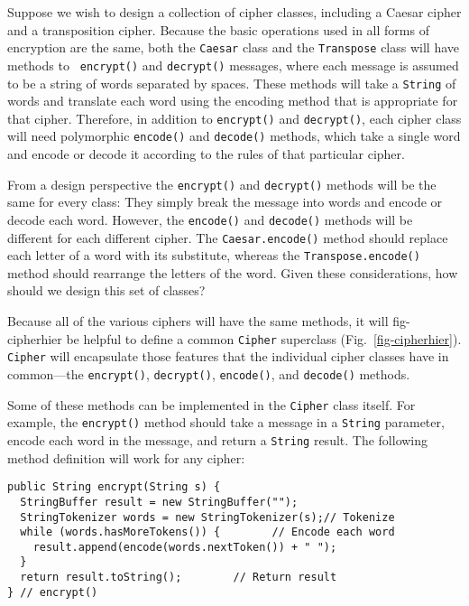 Suppose we wish to design a collection of cipher classes, including a
Caesar cipher and a transposition cipher.  Because the basic
operations used in all forms of encryption are the same, both the 
{\tt Caesar} class and the {\tt Transpose} class will have methods to {\tt
encrypt()} and {\tt decrypt()} messages, where each message is assumed
to be a string of words separated by spaces.  These methods will take
a {\tt String} of words and translate each word using the encoding
method that is appropriate for that cipher.  Therefore, in addition to
{\tt encrypt()} and {\tt decrypt()}, each cipher class will need
polymorphic {\tt encode()} and {\tt decode()} methods, which take a
single word and encode or decode it according to the rules of that
particular cipher.

From a design perspective the {\tt encrypt()} and {\tt decrypt()}
methods will be the same for every class: They simply break the
message into words and encode or decode each word.  However, the
{\tt encode()} and {\tt decode()} methods will be different for each
different cipher.  The {\tt Caesar.encode()} method should replace each
letter of a word with its substitute, whereas the
{\tt Transpose.encode()} method should rearrange the letters of the
word.  Given these considerations, how should we design this set of
classes?

Because all of the various ciphers will have the same methods, it will
{fig-cipherhier}
be helpful to define a common {\tt Cipher} superclass
(Fig.~\ref{fig-cipherhier}).  {\tt Cipher} will encapsulate those
features that the individual cipher classes have in common---the
{\tt encrypt()}, {\tt decrypt()}, {\tt encode()}, and {\tt decode()}
methods.

Some of these methods can be implemented in the {\tt Cipher} class
itself.  For example, the {\tt encrypt()} method should take a message
in a {\tt String} parameter, encode each word in the message, and
return a {\tt String} result.  The following method definition will
work for any cipher:

\begin{jjjlisting}[26.5pc]
\begin{lstlisting}
public String encrypt(String s) {
  StringBuffer result = new StringBuffer("");          
  StringTokenizer words = new StringTokenizer(s);// Tokenize
  while (words.hasMoreTokens()) {        // Encode each word 
    result.append(encode(words.nextToken()) + " "); 
  }
  return result.toString();        // Return result
} // encrypt()
\end{lstlisting}
\end{jjjlisting}

